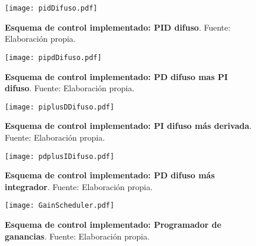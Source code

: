     \vfill

    \begin{figure}[htb]
        \centering
        \texttt{[image: pidDifuso.pdf]}
        \caption[Esquema de control implementado: PID difuso]{\textbf{Esquema de control implementado: PID difuso}. Fuente: Elaboración propia.} 
        \label{fig:pidDifuso}
    \end{figure}
    
    \vfill

    \pagebreak
    
    \vfill

    \begin{figure}[htb]
        \centering
        \texttt{[image: pipdDifuso.pdf]}
        \caption[Esquema de control implementado: PD difuso mas PI difuso]{\textbf{Esquema de control implementado: PD difuso mas PI difuso}. Fuente: Elaboración propia.} 
        \label{fig:pipdDifuso}
    \end{figure}
    
    \vfill

    \begin{figure}[htb]
        \centering
        \texttt{[image: piplusDDifuso.pdf]}
        \caption[Esquema de control implementado: PI difuso más derivada]{\textbf{Esquema de control implementado: PI difuso más derivada}. Fuente: Elaboración propia.} 
        \label{fig:piplusDDifuso}
    \end{figure}
    
    \vfill

    \begin{figure}[htb]
        \centering
        \texttt{[image: pdplusIDifuso.pdf]}
        \caption[Esquema de control implementado: PD difuso más integrador]{\textbf{Esquema de control implementado: PD difuso más integrador}. Fuente: Elaboración propia.} 
        \label{fig:pdplusIDifuso}
    \end{figure}
    
    \vfill

    \pagebreak
    
    \vfill

    \begin{figure}[htb]
        \centering
        \texttt{[image: GainScheduler.pdf]}
        \caption[Esquema de control implementado: Programador de ganancias]{\textbf{Esquema de control implementado: Programador de ganancias}. Fuente: Elaboración propia.} 
        \label{fig:GainScheduler}
    \end{figure}
    
